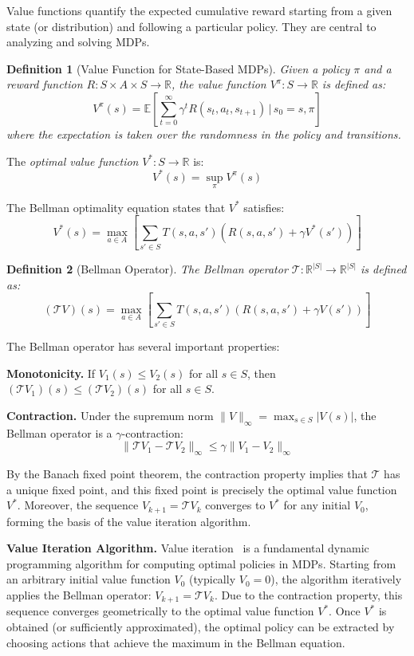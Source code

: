 \documentclass{article}
\newtheorem{definition}{Definition}
\begin{document}
Value functions quantify the expected cumulative reward starting from a given state (or distribution) and following a particular policy. They are central to analyzing and solving MDPs.

\begin{definition}[Value Function for State-Based MDPs]
Given a policy $\pi$ and a reward function $R: S \times A \times S \to \mathbb{R}$, the value function $V^\pi: S \to \mathbb{R}$ is defined as:
$$V^\pi(s) = \mathbb{E}\left[\sum_{t=0}^{\infty} \gamma^t R(s_t, a_t, s_{t+1}) \,\Big|\, s_0 = s, \pi\right]$$
where the expectation is taken over the randomness in the policy and transitions.
\end{definition}

The \emph{optimal value function} $V^*: S \to \mathbb{R}$ is:
$$V^*(s) = \sup_{\pi} V^\pi(s)$$

The Bellman optimality equation states that $V^*$ satisfies:
$$V^*(s) = \max_{a \in A} \left[\sum_{s' \in S} T(s,a,s')\left(R(s,a,s') + \gamma V^*(s')\right)\right]$$

\begin{definition}[Bellman Operator]
The Bellman operator $\mathcal{T}: \mathbb{R}^{|S|} \to \mathbb{R}^{|S|}$ is defined as:
$$(\mathcal{T}V)(s) = \max_{a \in A} \left[\sum_{s' \in S} T(s,a,s')\left(R(s,a,s') + \gamma V(s')\right)\right]$$
\end{definition}

The Bellman operator has several important properties:

\textbf{Monotonicity.} If $V_1(s) \leq V_2(s)$ for all $s \in S$, then $(\mathcal{T}V_1)(s) \leq (\mathcal{T}V_2)(s)$ for all $s \in S$.

\textbf{Contraction.} Under the supremum norm $\|V\|_\infty = \max_{s \in S} |V(s)|$, the Bellman operator is a $\gamma$-contraction:
$$\|\mathcal{T}V_1 - \mathcal{T}V_2\|_\infty \leq \gamma \|V_1 - V_2\|_\infty$$

By the Banach fixed point theorem, the contraction property implies that $\mathcal{T}$ has a unique fixed point, and this fixed point is precisely the optimal value function $V^*$. Moreover, the sequence $V_{k+1} = \mathcal{T}V_k$ converges to $V^*$ for any initial $V_0$, forming the basis of the value iteration algorithm.

\textbf{Value Iteration Algorithm.} Value iteration~\citep{bellman1957dynamic, puterman1994markov} is a fundamental dynamic programming algorithm for computing optimal policies in MDPs. Starting from an arbitrary initial value function $V_0$ (typically $V_0 = 0$), the algorithm iteratively applies the Bellman operator: $V_{k+1} = \mathcal{T}V_k$. Due to the contraction property, this sequence converges geometrically to the optimal value function $V^*$. Once $V^*$ is obtained (or sufficiently approximated), the optimal policy can be extracted by choosing actions that achieve the maximum in the Bellman equation.
\end{document}
